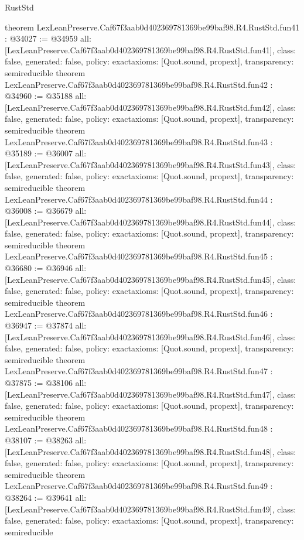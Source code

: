 \begin{lexlean}{RustStd}
\begin{coremodule}
{}
theorem LexLeanPreserve.Caf67f3aab0d402369781369be99baf98.R4.RustStd.fun41 : @34027 := @34959 {
  all: [LexLeanPreserve.Caf67f3aab0d402369781369be99baf98.R4.RustStd.fun41],
  class: false,
  generated: false,
  policy: exact{axioms: [Quot.sound, propext]},
  transparency: semireducible
}
theorem LexLeanPreserve.Caf67f3aab0d402369781369be99baf98.R4.RustStd.fun42 : @34960 := @35188 {
  all: [LexLeanPreserve.Caf67f3aab0d402369781369be99baf98.R4.RustStd.fun42],
  class: false,
  generated: false,
  policy: exact{axioms: [Quot.sound, propext]},
  transparency: semireducible
}
theorem LexLeanPreserve.Caf67f3aab0d402369781369be99baf98.R4.RustStd.fun43 : @35189 := @36007 {
  all: [LexLeanPreserve.Caf67f3aab0d402369781369be99baf98.R4.RustStd.fun43],
  class: false,
  generated: false,
  policy: exact{axioms: [Quot.sound, propext]},
  transparency: semireducible
}
theorem LexLeanPreserve.Caf67f3aab0d402369781369be99baf98.R4.RustStd.fun44 : @36008 := @36679 {
  all: [LexLeanPreserve.Caf67f3aab0d402369781369be99baf98.R4.RustStd.fun44],
  class: false,
  generated: false,
  policy: exact{axioms: [Quot.sound, propext]},
  transparency: semireducible
}
theorem LexLeanPreserve.Caf67f3aab0d402369781369be99baf98.R4.RustStd.fun45 : @36680 := @36946 {
  all: [LexLeanPreserve.Caf67f3aab0d402369781369be99baf98.R4.RustStd.fun45],
  class: false,
  generated: false,
  policy: exact{axioms: [Quot.sound, propext]},
  transparency: semireducible
}
theorem LexLeanPreserve.Caf67f3aab0d402369781369be99baf98.R4.RustStd.fun46 : @36947 := @37874 {
  all: [LexLeanPreserve.Caf67f3aab0d402369781369be99baf98.R4.RustStd.fun46],
  class: false,
  generated: false,
  policy: exact{axioms: [Quot.sound, propext]},
  transparency: semireducible
}
theorem LexLeanPreserve.Caf67f3aab0d402369781369be99baf98.R4.RustStd.fun47 : @37875 := @38106 {
  all: [LexLeanPreserve.Caf67f3aab0d402369781369be99baf98.R4.RustStd.fun47],
  class: false,
  generated: false,
  policy: exact{axioms: [Quot.sound, propext]},
  transparency: semireducible
}
theorem LexLeanPreserve.Caf67f3aab0d402369781369be99baf98.R4.RustStd.fun48 : @38107 := @38263 {
  all: [LexLeanPreserve.Caf67f3aab0d402369781369be99baf98.R4.RustStd.fun48],
  class: false,
  generated: false,
  policy: exact{axioms: [Quot.sound, propext]},
  transparency: semireducible
}
theorem LexLeanPreserve.Caf67f3aab0d402369781369be99baf98.R4.RustStd.fun49 : @38264 := @39641 {
  all: [LexLeanPreserve.Caf67f3aab0d402369781369be99baf98.R4.RustStd.fun49],
  class: false,
  generated: false,
  policy: exact{axioms: [Quot.sound, propext]},
  transparency: semireducible
}
\end{coremodule}
\end{lexlean}
